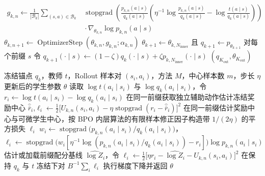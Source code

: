 \documentclass[lang=cn,scheme=chinese,openany]{elegantbook}
\newcommand{\sg}{\operatorname{stopgrad}}
\begin{document}
\begin{algorithm}[ht]
\begin{algorithmic}[1]
            \State $\begin{aligned}g_{k,n}\gets\frac1{|\mathcal B_k|}\sum_{(s,a)\in\mathcal B_k}&\sg\!\left(\frac{p_{k,n}(a\mid s)}{q_k(a\mid s)}\left(\eta^{-1}\log\frac{p_{k,n}(a\mid s)}{q_k(a\mid s)}-\log\frac{t(a\mid s)}{q_k(a\mid s)}\right)\right)\\&{}\cdot\nabla_{\theta_{k,n}}\log p_{k,n}(a\mid s)\end{aligned}$
        \EndIf
        \State $\theta_{k,n+1}\gets\operatorname{OptimizerStep}(\theta_{k,n},g_{k,n};\alpha_{k,n})$
    \EndFor
        \State $\theta_{k+1}\gets\theta_{k,N_{\mathrm{inner}}}$ 且 $q_{k+1}\gets p_{\theta_{k+1}}$
    \Else
        \State 对每个前缀 $s$ 令 $q_{k+1}(\cdot\mid s)\gets(1-\zeta)q_k(\cdot\mid s)+\zeta p_{k,N_{\mathrm{inner}}}(\cdot\mid s)$
    \EndIf
\EndFor
\State \Return $(q_{K_{\mathrm{out}}},\theta_{K_{\mathrm{out}}})$
\end{algorithmic}
\end{algorithm}

\begin{algorithm}[ht]
\caption{OPD 纯采样动作（Sampled-Token）内层更新\\{\small\textit{数学语义：每个前缀仅访问 Rollout 的采样动作及同前缀辅助动作}}}
\begin{algorithmic}[1]
\Require 冻结锚点 $q_k$，教师 $t$，Rollout 样本对 $(s_i,a_i)$，方法 $M$，中心样本数 $m$，步长 $\eta$
\Ensure 更新后的学生参数 $\theta$
    \State 读取 $\log t(a_i\mid s_i)$ 与 $\log q_k(a_i\mid s_i)$，令 $r_i\gets\log t(a_i\mid s_i)-\log q_k(a_i\mid s_i)$
        \State 在同一前缀获取独立辅助动作估计冻结奖励中心 $\widehat{\bar r}_i$,$\ell_i\gets\frac12\bigl[U_{k,n}(s_i,a_i)-\eta\sg(r_i-\widehat{\bar r}_i)\bigr]^2$
        \State 在同一前缀估计奖励中心与可微学生中心，按 BPO 内层算法的有限样本修正因子构造带 $1/(2\eta)$ 的平方损失 $\ell_i$
        \State $w_i\gets\sg\bigl(p_{k,n}(a_i\mid s_i)/q_k(a_i\mid s_i)\bigr)$，$\ell_i\gets\sg\bigl(w_i[\eta^{-1}\log(p_{k,n}(a_i\mid s_i)/q_k(a_i\mid s_i))-r_i]\bigr)\log p_{k,n}(a_i\mid s_i)$
        \State 估计或加载前缀配分基线 $\widehat{\log Z_i}$，令 $\ell_i\gets\frac12\bigl[\eta r_i-\widehat{\log Z_i}-U_{k,n}(s_i,a_i)\bigr]^2$
    \EndIf
\EndFor
\State 在保持 $q_k$ 与 $t$ 冻结下对 $B^{-1}\sum_i\ell_i$ 执行梯度下降并返回 $\theta$
\end{algorithmic}
\end{algorithm}
\end{document}
